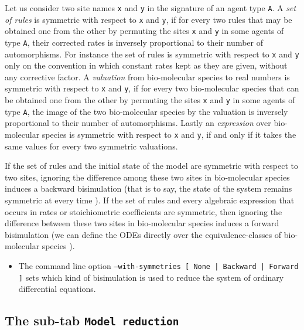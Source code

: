 \documentclass[11pt]{book}
\def\ttt#1{\texttt{#1}}
\begin{document}
Let us consider two site names \ttt{x} and \ttt{y} in the signature of an agent type \ttt{A}.
A \emph{set of rules} is symmetric with respect to \ttt{x} and \ttt{y}, if for every two rules that may be obtained one from the other by permuting the sites \ttt{x} and \ttt{y} in some agents of type \ttt{A}, their corrected rates is inversely proportional to their number of automorphisms.
For instance the set of rules is symmetric with respect to \ttt{x} and \ttt{y} only on the convention in which constant rates kept as they are given, without any corrective factor. A \emph{valuation} from bio-molecular species to real numbers is symmetric with respect to \ttt{x} and \ttt{y}, if for every two bio-molecular species that can be obtained one from the other by permuting the sites \ttt{x} and \ttt{y} in some agents of type \ttt{A}, the image of the two bio-molecular species by the valuation is inversely proportional to their number of automorphisms. Lastly an \emph{expression} over bio-molecular species is symmetric with respect to \ttt{x} and \ttt{y}, if and only if it takes the same values for every two symmetric valuations.

If the set of rules and the initial state of the model are symmetric with respect to two sites, ignoring the difference among these two sites in bio-molecular species induces a backward bisimulation (that is to say, the state of the system remains symmetric at every time \cite{buchholz_lump}). If the set of rules and every algebraic expression that occurs in rates or stoichiometric coefficients are symmetric, then ignoring the difference between these two sites in bio-molecular species induces a forward bisimulation (we can define the ODEs directly over the equivalence-classes of bio-molecular species \cite{buchholz_lump}).

\begin{itemize}
  \item
The command line option \texttt{--with-symmetries [ None | Backward | Forward ]} sets which kind of bisimulation is used to reduce the system of ordinary differential equations.
\end{itemize}

\subsection{The sub-tab \texttt{Model reduction}}
\end{document}
